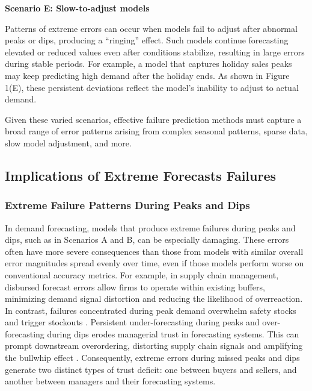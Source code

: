 \documentclass[12pt]{article}
\newenvironment{scenario}[1]{%
  \par\vspace{1ex}\noindent\textbf{#1}\par\vspace{0.5ex}}{\par}
\begin{document}
\begin{scenario}{Scenario E: Slow-to-adjust models}

Patterns of extreme errors can occur when models fail to adjust after abnormal 
peaks or dips, producing a “ringing” effect. Such models continue forecasting elevated or reduced values even after conditions stabilize, resulting in large errors during stable periods. For example, a model that captures holiday sales peaks may keep predicting high demand after the holiday ends. As shown in Figure 1(E), these persistent deviations reflect the model’s inability to adjust to actual demand.
\end{scenario}

Given these varied scenarios, effective failure prediction methods must capture a broad range of error patterns arising from complex seasonal patterns, sparse data, slow model adjustment, and more.

\subsection{Implications of Extreme Forecasts Failures}

\subsubsection{Extreme Failure Patterns During Peaks and Dips}

In demand forecasting, models that produce extreme failures during peaks and dips, such as in Scenarios A and B, can be especially damaging. These errors often have more severe consequences than those from models with similar overall error magnitudes spread evenly over time, even if those models perform worse on conventional accuracy metrics. For example, in supply chain management, disbursed forecast errors allow firms to operate within existing buffers, minimizing demand signal distortion and reducing the likelihood of overreaction. In contrast, failures concentrated during peak demand overwhelm safety stocks and trigger stockouts \citep{bray2019}. Persistent under-forecasting during peaks and over-forecasting during dips erodes managerial trust in forecasting systems. This can prompt downstream overordering, distorting supply chain signals and amplifying the bullwhip effect \citep{croson2014, wu2006}. Consequently, extreme errors during missed peaks and dips generate two distinct types of trust deficit: one between buyers and sellers, and another between managers and their forecasting systems. %
\end{document}
